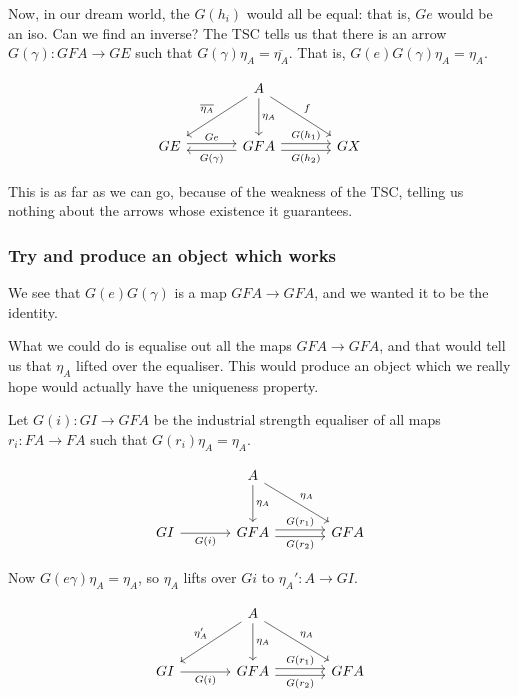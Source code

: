 \documentclass[11pt]{amsart}
\begin{document}
Now, in our dream world, the $G(h_i)$ would all be equal: that is, $Ge$ would be an iso.
Can we find an inverse?
The TSC tells us that there is an arrow $G(\gamma) : GFA \to GE$ such that $G(\gamma) \eta_A = \overline{\eta_A}$.
That is, $G(e) G(\gamma) \eta_A = \eta_A$.

\[
\begin{tikzcd}[row sep=large, column sep=large]
& A
    \arrow[dl, "\overline{\eta_A}"']
    \arrow[dr, "f"]
    \arrow[d, "\eta_A"]
&
\\
GE
    \arrow[r, shift left, "Ge"]
& GFA
    \arrow[l, shift left, "G(\gamma)"]
    \arrow[r, shift left, "G(h_1)"]
    \arrow[r, shift right, "G(h_2)"']
& GX
\end{tikzcd}
\]

This is as far as we can go, because of the weakness of the TSC, telling us nothing about the arrows whose existence it guarantees.

\subsubsection{Try and produce an object which works}
We see that $G(e) G(\gamma)$ is a map $GFA \to GFA$, and we wanted it to be the identity.

What we could do is equalise out all the maps $GFA \to GFA$, and that would tell us that $\eta_A$ lifted over the equaliser.
This would produce an object which we really hope would actually have the uniqueness property.

Let $G(i): GI \to GFA$ be the industrial strength equaliser of all maps $r_i: FA \to FA$ such that $G(r_i) \eta_A = \eta_A$.

\[
\begin{tikzcd}[row sep=large, column sep=large]
& A
    \arrow[dr, "\eta_A"]
    \arrow[d, "\eta_A"]
&
\\
GI
    \arrow[r, "G(i)"']
& GFA
    \arrow[r, shift left, "G(r_1)"]
    \arrow[r, shift right, "G(r_2)"']
& GFA
\end{tikzcd}
\]

Now $G(e \gamma) \eta_A = \eta_A$, so $\eta_A$ lifts over $Gi$ to $\eta_A': A \to GI$.

\[
\begin{tikzcd}[row sep=large, column sep=large]
& A
    \arrow[dl, "\eta'_A"']
    \arrow[dr, "\eta_A"]
    \arrow[d, "\eta_A"]
&
\\
GI
    \arrow[r, "G(i)"']
& GFA
    \arrow[r, shift left, "G(r_1)"]
    \arrow[r, shift right, "G(r_2)"']
& GFA
\end{tikzcd}
\]
\end{document}
